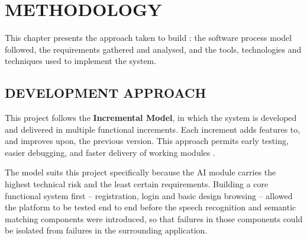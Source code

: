 %
\chapter{METHODOLOGY}
\label{ch:methodology}

This chapter presents the approach taken to build \fypProjectTitle{}:
the software process model followed, the requirements gathered and
analysed, and the tools, technologies and techniques used to implement
the system.

\section{DEVELOPMENT APPROACH}
\label{sec:dev-approach}

This project follows the \textbf{Incremental Model}, in which the system
is developed and delivered in multiple functional increments. Each
increment adds features to, and improves upon, the previous version.
This approach permits early testing, easier debugging, and faster
delivery of working modules \cite{pan2021roles}.

The model suits this project specifically because the AI module carries
the highest technical risk and the least certain requirements. Building
a core functional system first -- registration, login and basic design
browsing -- allowed the platform to be tested end to end before the
speech recognition and semantic matching components were introduced, so
that failures in those components could be isolated from failures in the
surrounding application.


